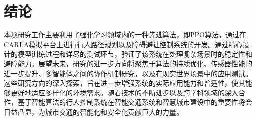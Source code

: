 \section{结论}

本项研究工作主要利用了强化学习领域内的一种先进算法，即PPO算法，通过在CARLA模拟平台上进行行人路径规划以及障碍避让控制系统的开发。通过精心设计的模型训练过程和详尽的测试环节，验证了该系统在处理复杂场景时的稳定性和避障能力。展望未来，研究的进一步方向将聚焦于算法的持续优化、传感器性能的进一步提升、多智能体之间的协作机制研究，以及在现实世界场景中的应用测试。这些研究方向的深入探索，旨在进一步增强系统的实际应用能力和普适性，使其能够更好地适应多样化的环境需求。随着技术的不断进步以及跨学科领域的深入合作，基于智能算法的行人控制系统在智能交通系统和智慧城市建设中的重要性将会日益凸显，为城市交通的智能化和安全化贡献巨大的力量。

